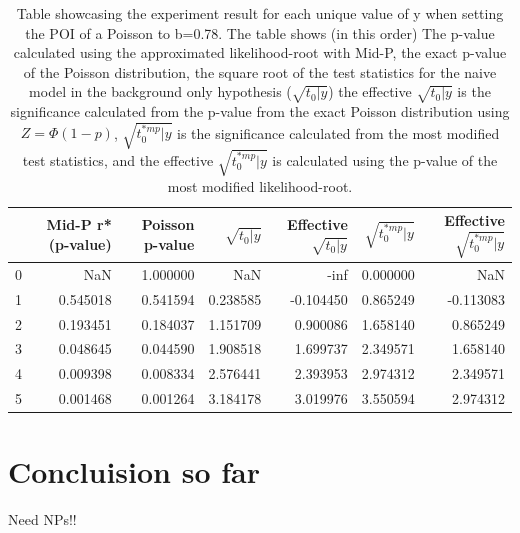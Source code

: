 \documentclass[14pt, a4paper]{article}  %
\begin{document}
\begin{table}[!ht]
    \centering
     \caption{Table showcasing the experiment result for each unique value of y when setting the POI of a Poisson to b=0.78. The table shows (in this order) The p-value calculated using the approximated likelihood-root with Mid-P, the exact p-value of the Poisson distribution, the square root of the test statistics for the naive model in the background only hypothesis ($\sqrt{t_0|y}$) the effective $\sqrt{t_0|y}$ is the significance calculated from the p-value from the exact Poisson distribution using $Z = \Phi(1-p)$, $\sqrt{t_0^{*mp}|y}$ is the significance calculated from the most modified test statistics, and the effective $\sqrt{t_0^{*mp}|y}$ is calculated using the p-value of the most modified likelihood-root.}
    \begin{tabular}{lrrrrrr}
    \toprule
     & Mid-P r* (p-value) & Poisson p-value & $\sqrt{t_0\vert y}$ & Effective $\sqrt{t_0\vert y}$ & $\sqrt{t_0^{*mp}\vert y}$ & Effective $\sqrt{t_0^{*mp}\vert y}$ \\
    \midrule
    0 & NaN & 1.000000 & NaN & -inf & 0.000000 & NaN \\
    1 & 0.545018 & 0.541594 & 0.238585 & -0.104450 & 0.865249 & -0.113083 \\
    2 & 0.193451 & 0.184037 & 1.151709 & 0.900086 & 1.658140 & 0.865249 \\
    3 & 0.048645 & 0.044590 & 1.908518 & 1.699737 & 2.349571 & 1.658140 \\
    4 & 0.009398 & 0.008334 & 2.576441 & 2.393953 & 2.974312 & 2.349571 \\
    5 & 0.001468 & 0.001264 & 3.184178 & 3.019976 & 3.550594 & 2.974312 \\
    \bottomrule
    \end{tabular}
\end{table}

\section{Concluision so far}
Need NPs!!

 
\newpage
\printbibliography
\end{document}
